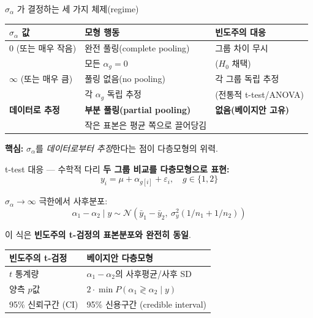 \documentclass[aspectratio=169, 11pt]{beamer}
\begin{document}
\begin{frame}{$\sigma_\alpha$ 가 결정하는 세 가지 체제(regime)}
\centering
\begin{tabular}{lll}
\toprule
$\sigma_\alpha$ 값 & 모형 행동 & 빈도주의 대응 \\
\midrule
0 (또는 매우 작음) & 완전 풀링(complete pooling) & 그룹 차이 무시 \\
& 모든 $\alpha_g = 0$ & ($H_0$ 채택) \\
\midrule
$\infty$ (또는 매우 큼) & 풀링 없음(no pooling) & 각 그룹 독립 추정 \\
& 각 $\alpha_g$ 독립 추정 & (전통적 t-test/ANOVA) \\
\midrule
\textbf{데이터로 추정} & \textbf{부분 풀링(partial pooling)} & \textbf{없음(베이지안 고유)} \\
& 작은 표본은 평균 쪽으로 끌어당김 & \\
\bottomrule
\end{tabular}

\vspace{0.4cm}
\textbf{핵심:} $\sigma_\alpha$를 \emph{데이터로부터 추정}한다는 점이 다층모형의 위력.
\end{frame}

\begin{frame}{t-test 대응 — 수학적 다리}
\textbf{두 그룹 비교를 다층모형으로 표현:}
$$
y_i = \mu + \alpha_{g[i]} + \varepsilon_i, \quad g \in \{1, 2\}
$$

\vspace{0.2cm}
$\sigma_\alpha \to \infty$ 극한에서 사후분포:
$$
\alpha_1 - \alpha_2 \mid y \sim \mathcal{N}\!\left(\bar y_1 - \bar y_2,\ \sigma_y^2(1/n_1+1/n_2)\right)
$$

\vspace{0.2cm}
이 식은 \textbf{빈도주의 t-검정의 표본분포와 완전히 동일}.

\vspace{0.3cm}
\begin{tabular}{ll}
\toprule
빈도주의 t-검정 & 베이지안 다층모형 \\
\midrule
$t$ 통계량 & $\alpha_1 - \alpha_2$의 사후평균/사후 SD \\
양측 $p$값 & $2 \cdot \min P(\alpha_1 \gtrless \alpha_2 \mid y)$ \\
95\% 신뢰구간 (CI) & 95\% 신용구간 (credible interval) \\
\bottomrule
\end{tabular}
\end{frame}
\end{document}
